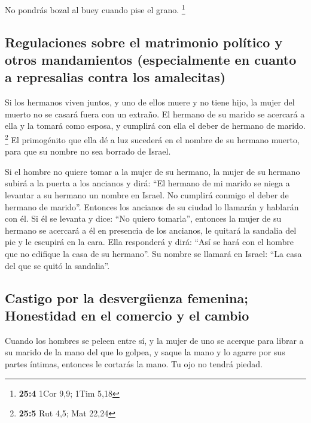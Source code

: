  No pondrás bozal al buey cuando pise el grano.
\footnote{\textbf{25:4} 1Cor 9,9; 1Tim 5,18}

\hypertarget{regulaciones-sobre-el-matrimonio-poluxedtico-y-otros-mandamientos-especialmente-en-cuanto-a-represalias-contra-los-amalecitas}{%
\subsection{Regulaciones sobre el matrimonio político y otros
mandamientos (especialmente en cuanto a represalias contra los
amalecitas)}\label{regulaciones-sobre-el-matrimonio-poluxedtico-y-otros-mandamientos-especialmente-en-cuanto-a-represalias-contra-los-amalecitas}}

 Si los hermanos viven juntos, y uno de ellos muere y no
tiene hijo, la mujer del muerto no se casará fuera con un extraño. El
hermano de su marido se acercará a ella y la tomará como esposa, y
cumplirá con ella el deber de hermano de marido. \footnote{\textbf{25:5}
  Rut 4,5; Mat 22,24}  El primogénito que ella dé a luz
sucederá en el nombre de su hermano muerto, para que su nombre no sea
borrado de Israel.

 Si el hombre no quiere tomar a la mujer de su hermano, la
mujer de su hermano subirá a la puerta a los ancianos y dirá: ``El
hermano de mi marido se niega a levantar a su hermano un nombre en
Israel. No cumplirá conmigo el deber de hermano de marido''.
 Entonces los ancianos de su ciudad lo llamarán y hablarán
con él. Si él se levanta y dice: ``No quiero tomarla'', 
entonces la mujer de su hermano se acercará a él en presencia de los
ancianos, le quitará la sandalia del pie y le escupirá en la cara. Ella
responderá y dirá: ``Así se hará con el hombre que no edifique la casa
de su hermano''.  Su nombre se llamará en Israel: ``La
casa del que se quitó la sandalia''.

\hypertarget{castigo-por-la-desverguxfcenza-femenina-honestidad-en-el-comercio-y-el-cambio}{%
\subsection{Castigo por la desvergüenza femenina; Honestidad en el
comercio y el
cambio}\label{castigo-por-la-desverguxfcenza-femenina-honestidad-en-el-comercio-y-el-cambio}}

 Cuando los hombres se peleen entre sí, y la mujer de uno
se acerque para librar a su marido de la mano del que lo golpea, y saque
la mano y lo agarre por sus partes íntimas,  entonces le
cortarás la mano. Tu ojo no tendrá piedad.

